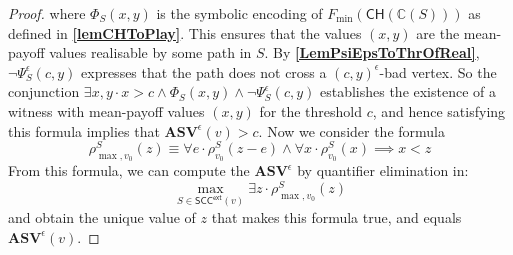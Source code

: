 \begin{proof}
\noindent where $\Phi_S(x,y)$ is the symbolic encoding of $F_{\min}(\mathsf{CH}(\mathbb{C}(S)))$ as defined in \textbf{\cref{lemCHToPlay}}. This ensures that the values $(x,y)$ are the mean-payoff values realisable by some path in $S$. By \textbf{\cref{LemPsiEpsToThrOfReal}}, $\neg \Psi_S^{\epsilon}(c, y)$ expresses that the path does not cross a $(c, y)^{\epsilon}$-bad vertex. So the conjunction $\exists x,y \cdot x > c \land \Phi_S(x,y) \land \neg \Psi_S^{\epsilon}(c, y)$ establishes the existence of a witness with mean-payoff values $(x,y)$ for the threshold $c$, and hence satisfying this formula implies that $\mathbf{ASV}^{\epsilon}(v) > c$.
Now we consider the formula
\begin{equation*}
    \rho^S_{\max,v_0}(z) \equiv \forall e \cdot \rho^S_{v_0}(z-e) \land \forall x \cdot \rho^S_{v_0}(x) \implies x < z
\end{equation*}
From this formula, we can compute the $\mathbf{ASV}^{\epsilon}$ by quantifier elimination in:
\begin{equation*}
    \max \limits_{S \in \mathsf{SCC}^{\mathsf{ext}}(v)} \exists z \cdot \rho^S_{\max,v_0}(z)
\end{equation*}
\noindent and obtain the unique value of $z$ that makes this formula true, and equals $\mathbf{ASV}^{\epsilon}(v)$.
\end{proof}

